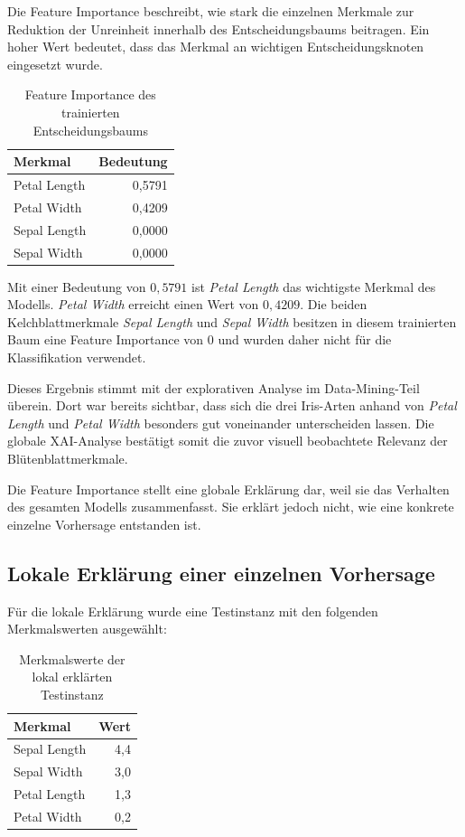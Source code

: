 \documentclass[12pt,a4paper]{article}
\begin{document}
Die Feature Importance beschreibt, wie stark die einzelnen Merkmale
zur Reduktion der Unreinheit innerhalb des Entscheidungsbaums
beitragen. Ein hoher Wert bedeutet, dass das Merkmal an wichtigen
Entscheidungsknoten eingesetzt wurde.

\begin{table}[H]
\centering
\caption{Feature Importance des trainierten Entscheidungsbaums}
\label{tab:xai-feature-importance}
\begin{tabular}{lr}
\toprule
\textbf{Merkmal} & \textbf{Bedeutung} \\
\midrule
Petal Length & 0{,}5791 \\
Petal Width  & 0{,}4209 \\
Sepal Length & 0{,}0000 \\
Sepal Width  & 0{,}0000 \\
\bottomrule
\end{tabular}
\end{table}

Mit einer Bedeutung von \(0{,}5791\) ist \textit{Petal Length} das
wichtigste Merkmal des Modells. \textit{Petal Width} erreicht einen
Wert von \(0{,}4209\). Die beiden Kelchblattmerkmale
\textit{Sepal Length} und \textit{Sepal Width} besitzen in diesem
trainierten Baum eine Feature Importance von \(0\) und wurden daher
nicht für die Klassifikation verwendet.

Dieses Ergebnis stimmt mit der explorativen Analyse im
Data-Mining-Teil überein. Dort war bereits sichtbar, dass sich die
drei Iris-Arten anhand von \textit{Petal Length} und
\textit{Petal Width} besonders gut voneinander unterscheiden lassen.
Die globale XAI-Analyse bestätigt somit die zuvor visuell beobachtete
Relevanz der Blütenblattmerkmale.

Die Feature Importance stellt eine globale Erklärung dar, weil sie
das Verhalten des gesamten Modells zusammenfasst. Sie erklärt jedoch
nicht, wie eine konkrete einzelne Vorhersage entstanden ist.

\subsection{Lokale Erklärung einer einzelnen Vorhersage}

Für die lokale Erklärung wurde eine Testinstanz mit den folgenden
Merkmalswerten ausgewählt:

\begin{table}[H]
\centering
\caption{Merkmalswerte der lokal erklärten Testinstanz}
\label{tab:xai-local-instance}
\begin{tabular}{lr}
\toprule
\textbf{Merkmal} & \textbf{Wert} \\
\midrule
Sepal Length & 4{,}4 \\
Sepal Width  & 3{,}0 \\
Petal Length & 1{,}3 \\
Petal Width  & 0{,}2 \\
\bottomrule
\end{tabular}
\end{table}
\end{document}
